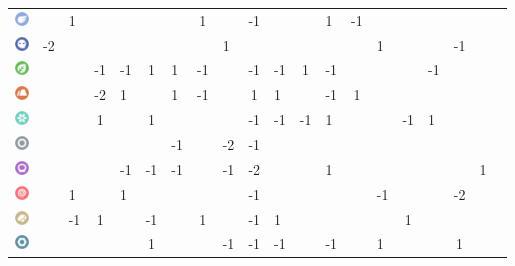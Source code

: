 \begin{table}[h]
\begin{center}
\begin{tabular}{c c g c g c g c g c g c g c g c g c g c}
    \includegraphics[width=1em]{images/flying.png} & & 1 & & & & & 1 & & -1 & & & 1 & -1 & & & & & \\ %
    \includegraphics[width=1em]{images/ghost.png} & -2 & & & & & & & 1 & & & & & & 1 & & & -1 & \\ %
    \includegraphics[width=1em]{images/grass.png} & & & -1 & -1 & 1 & 1 & -1 & & -1 & -1 & 1 & -1 & & & & -1 & & \\ %
    \includegraphics[width=1em]{images/ground.png} & & & -2 & 1 & & 1 & -1 & & 1 & 1 & & -1 & 1 & & & & & \\ %
    \includegraphics[width=1em]{images/ice.png} & & & 1 & & 1 & & & & -1 & -1 & -1 & 1 & & & -1 & 1 & & \\ %
    \includegraphics[width=1em]{images/normal.png} & & & & & & -1 & & -2 & -1 & & & & & & & & & \\ %
    \includegraphics[width=1em]{images/poison.png} & & & & -1 & -1 & -1 & & -1 & -2 & & & 1 & & & & & & 1 \\ %
    \includegraphics[width=1em]{images/psychic.png} & & 1 & & 1 & & & & & -1 & & & & & -1 & & & -2 & &  \\ %
    \includegraphics[width=1em]{images/rock.png} & & -1 & 1 & & -1 & & 1 & & -1 & 1 & & & & & 1 & & & \\ %
    \includegraphics[width=1em]{images/steel.png} & & & & & 1 & & & -1 & -1 & -1 & & -1 & & 1 & & & 1 & \\ %

\end{tabular}
\end{center}
\end{table}
